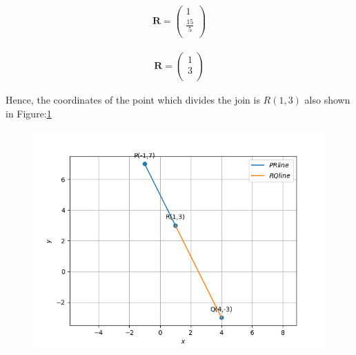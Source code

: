 \documentclass[12pt]{article}
\providecommand{\brak}[1]{\ensuremath{\left(#1\right)}}
\newcommand{\myvec}[1]{\ensuremath{\begin{pmatrix}#1\end{pmatrix}}}
\let\vec\mathbf
\begin{document}
\begin{align}
\vec{R}=\myvec{
1\\
	\frac{15}{5}\\
}
\end{align}


\begin{align}
 \vec{R}=\myvec{
        1\\
        3\\
  }
  \end{align}




Hence, the coordinates of the point which divides the join is $R\brak{1,3}$ also shown in Figure:\ref{fig:Fig}


\begin{figure}[!h]
\begin{center}
   \includegraphics[width=\columnwidth]{./figs/linefig.png}
\end{center}
\caption{}
\label{fig:Fig}
\end{figure}
\end{document}
